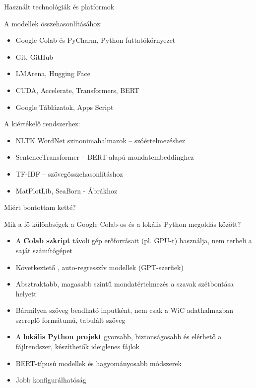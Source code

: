 \documentclass{beamer}
\begin{document}
    \begin{frame}{Használt technológiák és platformok}

        A modellek összehasonlításához:
        \begin{itemize}
            \item Google Colab és PyCharm, Python futtatókörnyezet
            \item Git, GitHub
            \item LMArena, Hugging Face
            \item CUDA, Accelerate, Transformers, BERT
            \item Google Táblázatok, Apps Script
        \end{itemize}
        A kiértékelő rendszerhez:
        \begin{itemize}
            \item NLTK WordNet szinonimahalmazok – szóértelmezéshez

            \item SentenceTransformer – BERT-alapú mondatembeddinghez

            \item TF-IDF – szövegösszehasonlításhoz %

            \item MatPlotLib, SeaBorn - Ábrákhoz
        \end{itemize}
    \end{frame}

    \begin{frame}{Miért bontottam ketté?}

        Mik a fő különbségek a Google Colab-os és a lokális Python megoldás között?
        \begin{itemize}
            \item A \textbf{Colab szkript} távoli gép erőforrásait (pl. GPU-t) használja, nem terheli a saját számítógépet\\
            \item Következtető , auto-regresszív modellek (GPT-szerűek)
            \item Absztraktabb, magasabb szintű mondatértelmezés a szavak szétbontása helyett \\
            \item  Bármilyen szöveg beadható inputként, nem csak a WiC adathalmazban szereplő formátumú, tabulált szöveg
            \vspace*{0.3cm}
            \item A \textbf{lokális Python projekt} gyorsabb, biztonságosabb és elérhető a fájlrendszer, készíthetők ideiglenes fájlok\\
            \item BERT-típusú modellek és hagyományosabb módszerek\\
            \item Jobb konfigurálhatóság
        \end{itemize}

    \end{frame}
\end{document}
